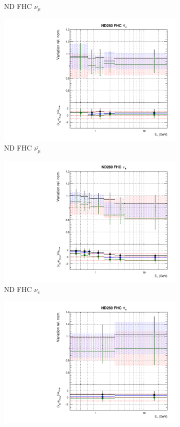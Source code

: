 \begin{figure}
\begin{subfigure}{0.45\textwidth}
  \caption{ND FHC $\nu_{\mu}$}
\end{subfigure}
\begin{subfigure}{0.45\textwidth}
  \centering
  \includegraphics[width=0.75\linewidth]{figs/fhcrhcfitsflux_1}
  \caption{ND FHC $\bar{\nu_{\mu}}$}
\end{subfigure}
\begin{subfigure}{0.45\textwidth}
  \centering
  \includegraphics[width=0.75\linewidth]{figs/fhcrhcfitsflux_2}
  \caption{ND FHC $\nu_e$}
\end{subfigure}
\begin{subfigure}{0.45\textwidth}
  \centering
  \includegraphics[width=0.75\linewidth]{figs/fhcrhcfitsflux_3}

\end{subfigure}
\end{figure}
